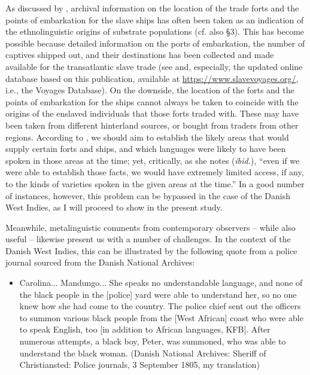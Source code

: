 \documentclass[output=paper,colorlinks,citecolor=brown]{langscibook}
\begin{document}
As discussed by \citet[109]{Velupillai_2015}, archival information on the location of the trade forts and the points of embarkation for the slave ships has often been taken as an indication of the ethnolinguistic origins of substrate populations (cf. also §3). This has become possible because detailed information on the ports of embarkation, the number of captives shipped out, and their destinations has been collected and made available for the transatlantic slave trade (see \cite{Eltis_Behrendt_Richardson_Klein_1999} and, especially, the updated online database based on this publication, available at \url{https://www.slavevoyages.org/}, i.e., the Voyages Database). On the downside, the location of the forts and the points of embarkation for the ships cannot always be taken to coincide with the origins of the enslaved individuals that those forts traded with. These may have been taken from different hinterland sources, or bought from traders from other regions. According to \citet[109]{Velupillai_2015}, we should aim to establish the likely areas that would supply certain forts and ships, and which languages were likely to have been spoken in those areas at the time; yet, critically, as she notes (\emph{ibid.}), “even if we were able to establish those facts, we would have extremely limited access, if any, to the kinds of varieties spoken in the given areas at the time.” In a good number of instances, however, this problem can be bypassed in the case of the Danish West Indies, as I will proceed to show in the present study.

Meanwhile, metalinguistic comments from contemporary observers – while also useful – likewise present us with a number of challenges. In the context of the Danish West Indies, this can be illustrated by the following quote from a police journal sourced from the Danish National Archives:

\begin{itemize}[label={}]
    \item Carolina... Mandungo... She speaks no understandable language, and none of the black people in the [police] yard were able to understand her, so no one knew how she had come to the country. The police chief sent out the officers to summon various black people from the [West African] coast who were able to speak English, too [in addition to African languages, KFB]. After numerous attempts, a black boy, Peter, was summoned, who was able to understand the black woman. (Danish National Archives: Sheriff of Christiansted: Police journals, 3 September 1805, my translation)
\end{itemize}
\end{document}

